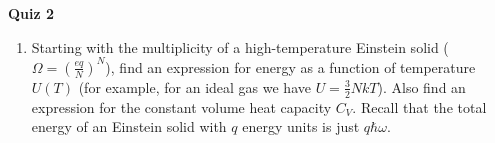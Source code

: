 \documentclass{article}
\begin{document}
\fancyfoot[C]{\thepage}
\vspace*{0cm}
\begin{center}
	{\LARGE \textbf{Quiz 2}}\\
	\vspace{.25cm}
\end{center}
\begin{enumerate}
	\item Starting with the multiplicity of a high-temperature Einstein solid ($\Omega=\left(\frac{eq}{N}\right)^N$), find an expression for energy as a function of temperature $U(T)$ (for example, for an ideal gas we have $U=\frac{3}{2}NkT$). Also find an expression for the constant volume heat capacity $C_V$. Recall that the total energy of an Einstein solid with $q$ energy units is just $q\hbar\omega$.
\end{enumerate}
\end{document}
